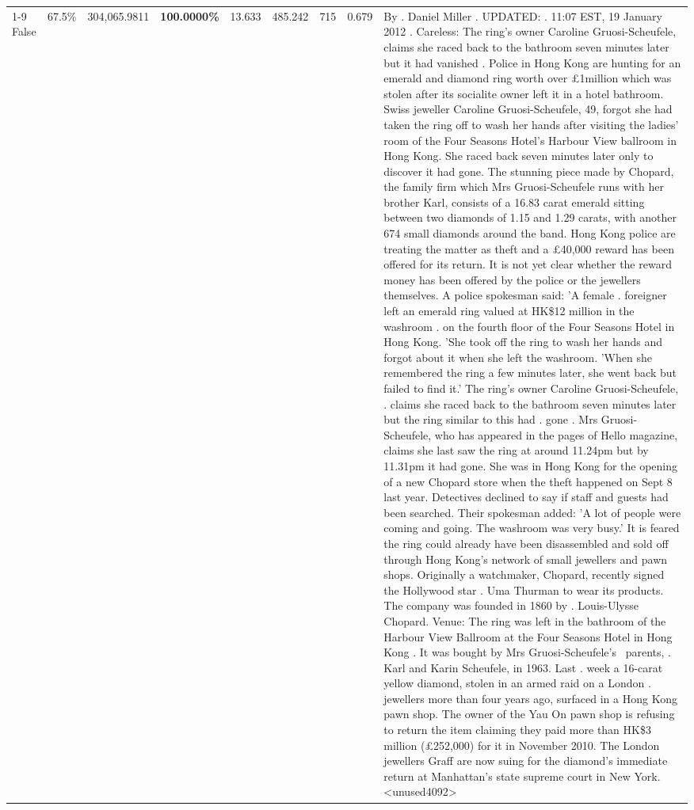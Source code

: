 \begin{table}[H]
\begin{tabular}{lllrlllll}
\cline{1-9}
False & 67.5\% & 304,065.9811 & \bfseries \color{red} 100.0000\% & 13.633 & 485.242 & 715 & 0.679 & By . Daniel Miller . UPDATED: . 11:07 EST, 19 January 2012 . Careless: The ring's owner Caroline Gruosi-Scheufele, claims she raced back to the bathroom seven minutes later but it had vanished . Police in Hong Kong are hunting for an emerald and diamond ring worth over £1million which was stolen after its socialite owner left it in a hotel bathroom. Swiss jeweller Caroline Gruosi-Scheufele, 49, forgot she had taken the ring off to wash her hands after visiting the ladies' room of the Four Seasons Hotel's Harbour View ballroom in Hong Kong. She raced back seven minutes later only to discover it had gone. The stunning piece made by Chopard, the family firm which Mrs Gruosi-Scheufele runs with her brother Karl, consists of a 16.83 carat emerald sitting between two diamonds of 1.15 and 1.29 carats, with another 674 small diamonds around the band. Hong Kong police are treating the matter as theft and a £40,000 reward has been offered for its return. It is not yet clear whether the reward money has been offered by the police or the jewellers themselves. A police spokesman said: 'A female . foreigner left an emerald ring valued at HK\$12 million in the washroom . on the fourth floor of the Four Seasons Hotel in Hong Kong. 'She took off the ring to wash her hands and forgot about it when she left the washroom. 'When she remembered the ring a few minutes later, she went back but failed to find it.' The ring's owner Caroline Gruosi-Scheufele, . claims she raced back to the bathroom seven minutes later but the ring similar to this had . gone . Mrs Gruosi-Scheufele, who has appeared in the pages of Hello magazine, claims she last saw the ring at around 11.24pm but by 11.31pm it had gone. She was in Hong Kong for the opening of a new Chopard store when the theft happened on Sept 8 last year. Detectives declined to say if staff and guests had been searched. Their spokesman added: 'A lot of people were coming and going. The washroom was very busy.' It is feared the ring could already have been disassembled and sold off through Hong Kong's network of small jewellers and pawn shops. Originally a watchmaker, Chopard, recently signed the Hollywood star . Uma Thurman to wear its products. The company was founded in 1860 by . Louis-Ulysse Chopard. Venue: The ring was left in the bathroom of the Harbour View Ballroom at the Four Seasons Hotel in Hong Kong . It was bought by Mrs Gruosi-Scheufele's  parents, . Karl and Karin Scheufele, in 1963. Last . week a 16-carat yellow diamond, stolen in an armed raid on a London . jewellers more than four years ago, surfaced in a Hong Kong pawn shop. The owner of the Yau On pawn shop is refusing to return the item claiming they paid more than HK\$3 million (£252,000) for it in November 2010. The London jewellers Graff are now suing for the diamond’s immediate return at Manhattan’s state supreme court in New York.<unused4092> \\

\end{tabular}
\end{table}
